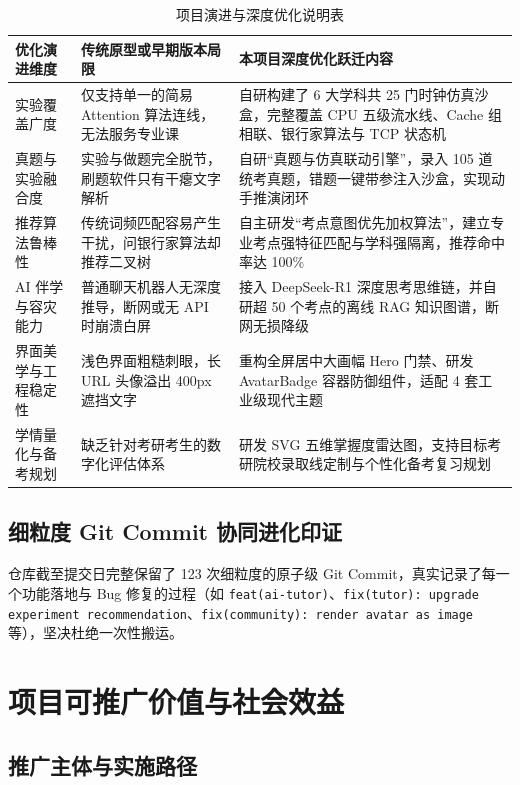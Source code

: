 \documentclass[UTF8,a4paper,11pt]{ctexart}
\begin{document}
\begin{table}[htbp]
\centering
\small
\caption{项目演进与深度优化说明表}
\begin{tabularx}{\textwidth}{p{2.8cm}Xp{5.5cm}}
\toprule
\textbf{优化演进维度} & \textbf{传统原型或早期版本局限} & \textbf{本项目深度优化跃迁内容} \\
\midrule
实验覆盖广度 & 仅支持单一的简易 Attention 算法连线，无法服务专业课 & 自研构建了 6 大学科共 25 门时钟仿真沙盒，完整覆盖 CPU 五级流水线、Cache 组相联、银行家算法与 TCP 状态机 \\
真题与实验融合度 & 实验与做题完全脱节，刷题软件只有干瘪文字解析 & 自研“真题与仿真联动引擎”，录入 105 道统考真题，错题一键带参注入沙盒，实现动手推演闭环 \\
推荐算法鲁棒性 & 传统词频匹配容易产生干扰，问银行家算法却推荐二叉树 & 自主研发“考点意图优先加权算法”，建立专业考点强特征匹配与学科强隔离，推荐命中率达 100\% \\
AI 伴学与容灾能力 & 普通聊天机器人无深度推导，断网或无 API 时崩溃白屏 & 接入 DeepSeek-R1 深度思考思维链，并自研超 50 个考点的离线 RAG 知识图谱，断网无损降级 \\
界面美学与工程稳定性 & 浅色界面粗糙刺眼，长 URL 头像溢出 400px 遮挡文字 & 重构全屏居中大画幅 Hero 门禁、研发 AvatarBadge 容器防御组件，适配 4 套工业级现代主题 \\
学情量化与备考规划 & 缺乏针对考研考生的数字化评估体系 & 研发 SVG 五维掌握度雷达图，支持目标考研院校录取线定制与个性化备考复习规划 \\
\bottomrule
\end{tabularx}
\end{table}

\subsection{细粒度 Git Commit 协同进化印证}
仓库截至提交日完整保留了 123 次细粒度的原子级 Git Commit，真实记录了每一个功能落地与 Bug 修复的过程（如 \texttt{feat(ai-tutor)}、\texttt{fix(tutor): upgrade experiment recommendation}、\texttt{fix(community): render avatar as image} 等），坚决杜绝一次性搬运。

\section{项目可推广价值与社会效益}

\subsection{推广主体与实施路径}
\end{document}
